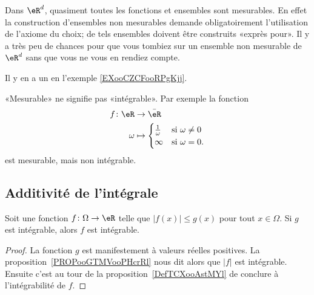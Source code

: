 \begin{remark}
	Dans \( \eR^d\), quasiment toutes les fonctions et ensembles sont mesurables. En effet la construction d'ensembles non mesurables demande obligatoirement l'utilisation de l'axiome du choix; de tels ensembles doivent être construits «exprès pour». Il y a très peu de chances pour que vous tombiez sur un ensemble non mesurable de \( \eR^d\) sans que vous ne vous en rendiez compte.

	Il y en a un en l'exemple \ref{EXooCZCFooRPgKjj}.
\end{remark}

\begin{remark}
	«Mesurable» ne signifie pas «intégrable». Par exemple la fonction
	\begin{equation}
		\begin{aligned}
			f\colon \eR & \to \bar\eR                                         \\
			\omega      & \mapsto\begin{cases}
				                     \frac{1}{ \omega } & \text{si } \omega\neq 0 \\
				                     \infty             & \text{si }\omega=0.
			                     \end{cases}
		\end{aligned}
	\end{equation}
	est mesurable, mais non intégrable.
\end{remark}

\subsection{Additivité de l'intégrale}

\begin{lemma}   \label{LemPfHgal}
	Soit une fonction \( f\colon \Omega\to \eR\) telle que \( | f(x)|\leq g(x) \) pour tout \( x\in\Omega\). Si \( g\) est intégrable, alors \( f\) est intégrable.
\end{lemma}

\begin{proof}
	La fonction \( g\) est manifestement à valeurs réelles positives. La proposition~\ref{PROPooGTMVooPHcrRl} nous dit alors que \( | f |\) est intégrable. Ensuite c'est au tour de la proposition~\ref{DefTCXooAstMYl} de conclure à l'intégrabilité de \( f\).
\end{proof}

